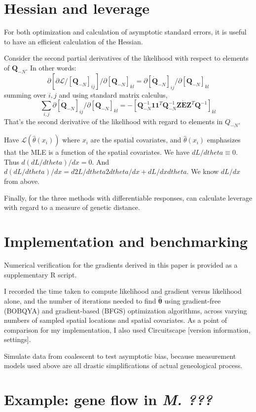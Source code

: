 \documentclass[11pt]{article}
\newcommand{\mat}[1]{\mathbf{#1}}
\begin{document}
\section{Hessian and leverage}
For both optimization and calculation of asymptotic standard errors, it is useful to have an efficient calculation of the Hessian.

Consider the second partial derivatives of the likelihood with respect to elements of $\mat Q_{-N}$. In other words:
\[
  \partial[ \partial \mathcal{L} / [\mat Q_{-N}]_{ij} ]/ \partial [\mat Q_{-N}]_{kl} = \partial [\dot{\mat Q}_{-N}]_{ij} / \partial [\mat Q_{-N}]_{kl}
\]
summing over $i,j$ and using standard matrix calculus,
\[
  \sum_{i,j} 
  \partial [\dot{\mat Q}_{-N}]_{ij} / \partial [\mat Q_{-N}]_{kl}
  =
  -[\mat Q^{-1}_{-N} \mat 1 \mat 1^T \mat Q^{-1}_{-N} \mat Z \dot{\mat E} \mat Z^T \mat Q^{-1}]_{kl}
\]
That's the second derivative of the likelihood with regard to elements in $Q_{-N}$.

%





Have $\mathcal{L}(\hat{\theta}(x_i))$ where $x_i$ are the spatial covariates, and $\hat{\theta}(x_i)$ emphasizes that the MLE is a function of the spatial covariates.
We have $dL/dtheta \equiv 0$. Thus $d(dL/dtheta)/dx = 0$. And $d(dL/dtheta)/dx = d2L/dtheta2 dtheta/dx + dL/dx dtheta$. We know $dL/dx$ from above.

Finally, for the three methods with differentiable responses, can calculate leverage with regard to a measure of genetic distance.


\section{Implementation and benchmarking}
Numerical verification for the gradients derived in this paper is provided as a supplementary R script.

I recorded the time taken to compute likelihood and gradient versus likelihood alone, and the number of iterations
needed to find $\hat{\bm \theta}$ using gradient-free (BOBQYA) and gradient-based (BFGS) optimization algorithms, across 
varying numbers of sampled spatial locations and spatial covariates. As a point of comparison for my implementation,
I also used Circuitscape [version information, settings].

Simulate data from coalescent to test asymptotic bias, because measurement models used above are all drastic simplifications of actual geneological process.

\section{Example: gene flow in \emph{M. ???}}
\end{document}
